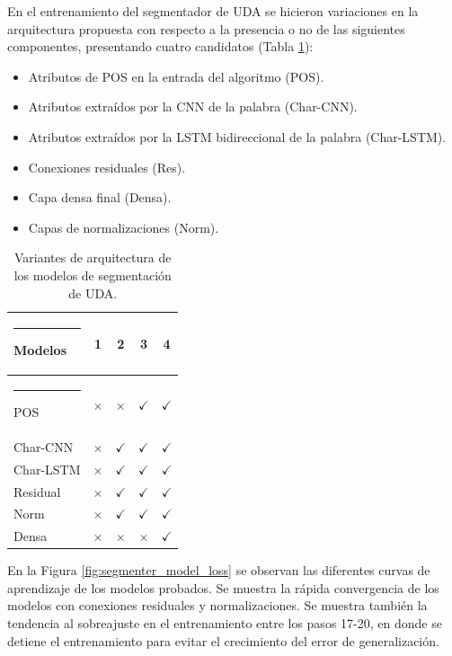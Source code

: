 \documentclass[a4paper,11pt,twocolumn,twoside]{article}
\begin{document}

En el entrenamiento del segmentador de UDA se hicieron variaciones en la arquitectura propuesta con respecto a la
presencia o no de las siguientes componentes, presentando cuatro candidatos (Tabla \ref{table:segmenter_architecture_table}):

\begin{itemize}
	\item Atributos de POS en la entrada del algoritmo (POS).
	\item Atributos extraídos por la CNN de la palabra (Char-CNN).
	\item Atributos extraídos por la LSTM bidireccional de la palabra (Char-LSTM).
	\item Conexiones residuales (Res).
	\item Capa densa final (Densa).
	\item Capas de normalizaciones (Norm).
\end{itemize}

\begin{table}[h]
	\begin{center}
		\begin{tabular}{|l|c|c|c|c|} 
			\hline\rule{-2pt}{15pt}
			{\bf Modelos}  & {\bf 1}     & {\bf 2}     & {\bf 3}     & {\bf 4}     \\ 
			\hline\rule{-4pt}{10pt}
			POS 	  & $\times$  & $\times$ 	 & $\checkmark$ & $\checkmark$ \\
			Char-CNN  & $\times$  & $\checkmark$ & $\checkmark$ & $\checkmark$ \\
			Char-LSTM & $\times$  & $\checkmark$ & $\checkmark$ & $\checkmark$ \\
			Residual  & $\times$  & $\checkmark$ & $\checkmark$ & $\checkmark$ \\
			Norm 	  & $\times$  & $\checkmark$ & $\checkmark$ & $\checkmark$ \\
			Densa 	  & $\times$  & $\times$ 	 & $\times$ 	& $\checkmark$ \\
			\hline
		\end{tabular}
	\end{center}
	\caption{\label{table:segmenter_architecture_table}Variantes de arquitectura de los modelos de segmentación de UDA.}
\end{table}

En la Figura \ref{fig:segmenter_model_loss} se observan las diferentes curvas de aprendizaje de los modelos 
probados. Se muestra la rápida convergencia de los modelos con conexiones residuales y normalizaciones.
Se muestra también la tendencia al sobreajuste en el entrenamiento entre los pasos 17-20, en donde se detiene el 
entrenamiento para evitar el crecimiento del error de generalización.
\end{document}
